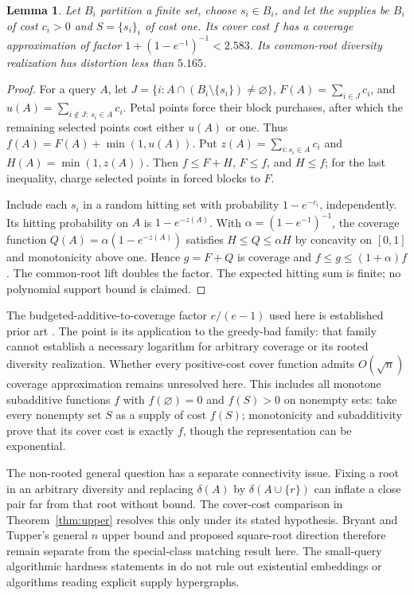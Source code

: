 \documentclass[11pt]{article}
\newtheorem{lemma}[theorem]{Lemma}
\begin{document}
\begin{lemma}\label{lem:transversal-cover}
Let $B_i$ partition a finite set, choose $s_i\in B_i$, and let the supplies
be $B_i$ of cost $c_i>0$ and $S=\{s_i\}_i$ of cost one. Its cover cost $f$
has a coverage approximation of factor $1+(1-e^{-1})^{-1}<2.583$.
Its common-root diversity realization has distortion less than $5.165$.
\end{lemma}
\begin{proof}
For a query $A$, let $J=\{i:A\cap(B_i\setminus\{s_i\})\ne\varnothing\}$,
$F(A)=\sum_{i\in J}c_i$, and
$u(A)=\sum_{i\notin J:\ s_i\in A}c_i$. Petal points force their block
purchases, after which the remaining selected points cost either $u(A)$
or one. Thus $f(A)=F(A)+\min(1,u(A))$.
Put $z(A)=\sum_{i:s_i\in A}c_i$ and $H(A)=\min(1,z(A))$.
Then $f\le F+H$, $F\le f$, and $H\le f$; for the last inequality,
charge selected points in forced blocks to $F$.

Include each $s_i$ in a random hitting set with probability $1-e^{-c_i}$,
independently. Its hitting probability on $A$ is $1-e^{-z(A)}$.
With $\alpha=(1-e^{-1})^{-1}$, the coverage function
$Q(A)=\alpha(1-e^{-z(A)})$ satisfies $H\le Q\le\alpha H$ by concavity
on $[0,1]$ and monotonicity above one. Hence $g=F+Q$ is coverage and
$f\le g\le(1+\alpha)f$. The common-root lift doubles the factor.
The expected hitting sum is finite; no polynomial support bound is claimed.
\end{proof}

The budgeted-additive-to-coverage factor $e/(e-1)$ used here is established
prior art \cite{DDSSS}. The point is its application to the greedy-bad
family: that family cannot establish a necessary logarithm for arbitrary
coverage or its rooted diversity realization.
Whether every positive-cost cover function admits $O(\sqrt n)$ coverage
approximation remains unresolved here. This includes all monotone subadditive functions $f$ with $f(\varnothing)=0$
and $f(S)>0$ on nonempty sets: take every nonempty set $S$ as a supply of cost
$f(S)$; monotonicity and subadditivity prove that its cover cost is exactly
$f$, though the representation can be exponential.

The non-rooted general question has a separate connectivity issue.
Fixing a root in an arbitrary diversity and replacing $\delta(A)$ by
$\delta(A\cup\{r\})$ can inflate a close pair far from that root without
bound. The cover-cost comparison in Theorem~\ref{thm:upper} resolves this
only under its stated hypothesis. Bryant and Tupper's general $n$ upper
bound and proposed square-root direction \cite{BT17} therefore remain
separate from the special-class matching result here. The small-query
algorithmic hardness statements in \cite[Section 5]{JS} do not rule out
existential embeddings or algorithms reading explicit supply hypergraphs.
\end{document}
